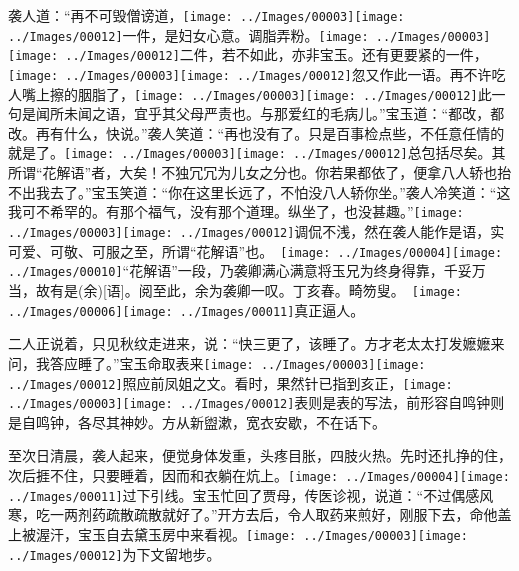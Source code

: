 袭人道：``再不可毁僧谤道，{\texttt{[image: ../Images/00003]}\texttt{[image: ../Images/00012]}\footnotesize \kaishu 一件，是妇女心意。}调脂弄粉。{\texttt{[image: ../Images/00003]}\texttt{[image: ../Images/00012]}\footnotesize \kaishu 二件，若不如此，亦非宝玉。}还有更要紧的一件，{\texttt{[image: ../Images/00003]}\texttt{[image: ../Images/00012]}\footnotesize \kaishu 忽又作此一语。}再不许吃人嘴上擦的胭脂了，{\texttt{[image: ../Images/00003]}\texttt{[image: ../Images/00012]}\footnotesize \kaishu 此一句是闻所未闻之语，宜乎其父母严责也。}与那爱红的毛病儿。''宝玉道：``都改，都改。再有什么，快说。''袭人笑道：``再也没有了。只是百事检点些，不任意任情的就是了。{\texttt{[image: ../Images/00003]}\texttt{[image: ../Images/00012]}\footnotesize \kaishu 总包括尽矣。其所谓``花解语''者，大矣！不独冗冗为儿女之分也。}你若果都依了，便拿八人轿也抬不出我去了。''宝玉笑道：``你在这里长远了，不怕没八人轿你坐。''袭人冷笑道：``这我可不希罕的。有那个福气，没有那个道理。纵坐了，也没甚趣。''{\texttt{[image: ../Images/00003]}\texttt{[image: ../Images/00012]}\footnotesize \kaishu 调侃不浅，然在袭人能作是语，实可爱、可敬、可服之至，所谓``花解语''也。　{\texttt{[image: ../Images/00004]}\texttt{[image: ../Images/00010]}\footnotesize \kaishu ``花解语''一段，乃袭卿满心满意将玉兄为终身得靠，千妥万当，故有是{(余)}{[}语{]}。阅至此，余为袭卿一叹。丁亥春。畸笏叟。　}\texttt{[image: ../Images/00006]}\texttt{[image: ../Images/00011]}\footnotesize \kaishu 真正逼人。}

二人正说着，只见秋纹走进来，说：``快三更了，该睡了。方才老太太打发嬷嬷来问，我答应睡了。''宝玉命取表来{\texttt{[image: ../Images/00003]}\texttt{[image: ../Images/00012]}\footnotesize \kaishu 照应前凤姐之文。}看时，果然针已指到亥正，{\texttt{[image: ../Images/00003]}\texttt{[image: ../Images/00012]}\footnotesize \kaishu 表则是表的写法，前形容自鸣钟则是自鸣钟，各尽其神妙。}方从新盥漱，宽衣安歇，不在话下。

至次日清晨，袭人起来，便觉身体发重，头疼目胀，四肢火热。先时还扎挣的住，次后捱不住，只要睡着，因而和衣躺在炕上。{\texttt{[image: ../Images/00004]}\texttt{[image: ../Images/00011]}\footnotesize \kaishu 过下引线。}宝玉忙回了贾母，传医诊视，说道：``不过偶感风寒，吃一两剂药疏散疏散就好了。''开方去后，令人取药来煎好，刚服下去，命他盖上被渥汗，宝玉自去黛玉房中来看视。{\texttt{[image: ../Images/00003]}\texttt{[image: ../Images/00012]}\footnotesize \kaishu 为下文留地步。}

